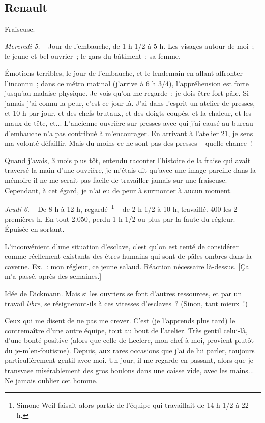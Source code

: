 \documentclass[french,twoside]{book} %
\begin{document}
\subsection[Renault]{Renault}
\noindent \par
Fraiseuse.\par
{\itshape Mercredi 5.} – Jour de l'embauche, de 1 h 1/2 à 5 h. Les visages autour de moi ; le jeune et bel ouvrier ; le gars du bâtiment ; sa femme.\par
Émotions terribles, le jour de l'embauche, et le lendemain en allant affronter l'inconnu ; dans ce métro matinal (j'arrive à 6 h 3/4), l'appréhension est forte jusqu'au malaise physique. Je vois qu'on me regarde ; je dois être fort pâle. Si jamais j'ai connu la peur, c'est ce jour-là. J'ai dans l'esprit un atelier de presses, et 10 h par jour, et des chefs brutaux, et des doigts coupés, et la chaleur, et les maux de tête, et... L'ancienne ouvrière sur presses avec qui j’ai causé au bureau d'embauche n'a pas contribué à m'encourager. En arrivant à l'atelier 21, je sens ma volonté défaillir. Mais du moins ce ne sont pas des presses – quelle chance !\par
Quand j'avais, 3 mois plus tôt, entendu raconter l'histoire de la fraise qui avait traversé la main d'une ouvrière, je m'étais dit qu'avec une image pareille dans la mémoire il ne me serait pas facile de travailler jamais sur une fraiseuse. Cependant, à cet égard, je n'ai eu de peur à surmonter à aucun moment.\par
{\itshape Jeudi 6}. – De 8 h à 12 h, regardé \footnote{Simone Weil faisait alors partie de l'équipe qui travaillait de 14 h 1/2 à 22 h.} – de 2 h 1/2 à 10 h, travaillé. 400 les 2 premières h. En tout 2.050, perdu 1 h 1/2 ou plus par la faute du régleur. Épuisée en sortant.\par
L'inconvénient d'une situation d'esclave, c'est qu'on est tenté de considérer comme réellement existants des êtres humains qui sont de pâles ombres dans la caverne. Ex. : mon régleur, ce jeune salaud. Réaction nécessaire là-dessus. [Ça m'a passé, après des semaines.]\par
Idée de Dickmann. Mais si les ouvriers se font d'autres ressources, et par un travail {\itshape libre}, se résigneront-ils à ces vitesses d'esclaves ? (Sinon, tant mieux !)\par
Ceux qui me disent de ne pas me crever. C'est (je l'apprends plus tard) le contremaître d'une autre équipe, tout au bout de l'atelier. Très gentil celui-là, d'une bonté positive (alors que celle de Leclerc, mon chef à moi, provient plutôt du je-m'en-foutisme). Depuis, aux rares occasions que j'ai de lui parler, toujours particulièrement gentil avec moi. Un jour, il me regarde en passant, alors que je transvase misérablement des gros boulons dans une caisse vide, avec les mains... Ne jamais oublier cet homme.\par
\end{document}
